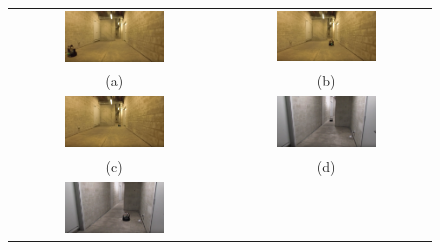 \begin{figure}
  \begin{tabular}{cc}
    \centering \footnotesize
    \includegraphics[width=0.50\textwidth]{images/KobukiSotano1.png}&
    \includegraphics[width=0.50\textwidth]{images/KobukiSotano2.png}\\
    (a)&(b)\\
    \includegraphics[width=0.50\textwidth]{images/KobukiSotano3.png}&
    \includegraphics[width=0.50\textwidth]{images/KobukiSotano4.png}\\
    (c)&(d)\\
    \includegraphics[width=0.50\textwidth]{images/KobukiSotano5.png}&

\end{tabular}
\end{figure}
